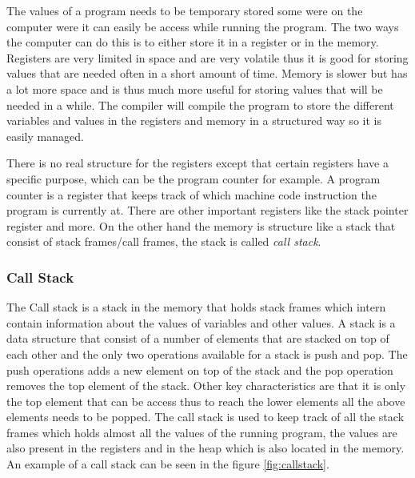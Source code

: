  

The values of a program needs to be temporary stored some were on the computer were it can easily be access while running the program.
The two ways the computer can do this is to either store it in a register or in the memory.
Registers are very limited in space and are very volatile thus it is good for storing values that are needed often in a short amount of time.
Memory is slower but has a lot more space and is thus much more useful for storing values that will be needed in a while.
The compiler will compile the program to store the different variables and values in the registers and memory in a structured way so it is easily managed.

There is no real structure for the registers except that certain registers have a specific purpose, which can be the program counter for example.
A program counter is a register that keeps track of which machine code instruction the program is currently at.
There are other important registers like the stack pointer register and more.
On the other hand the memory is structure like a stack that consist of stack frames/call frames, the stack is called \emph{call stack}.


\subsubsection{Call Stack}
The Call stack is a stack in the memory that holds stack frames which intern contain information about the values of variables and other values.
A stack is a data structure that consist of a number of elements that are stacked on top of each other and the only two operations available for a stack is push and pop.
The push operations adds a new element on top of the stack and the pop operation removes the top element of the stack.
Other key characteristics are that it is only the top element that can be access thus to reach the lower elements all the above elements needs to be popped.
The call stack is used to keep track of all the stack frames which holds almost all the values of the running program, the values are also present in the registers and in the heap which is also located in the memory.
An example of a call stack can be seen in the figure \ref{fig:callstack}.


